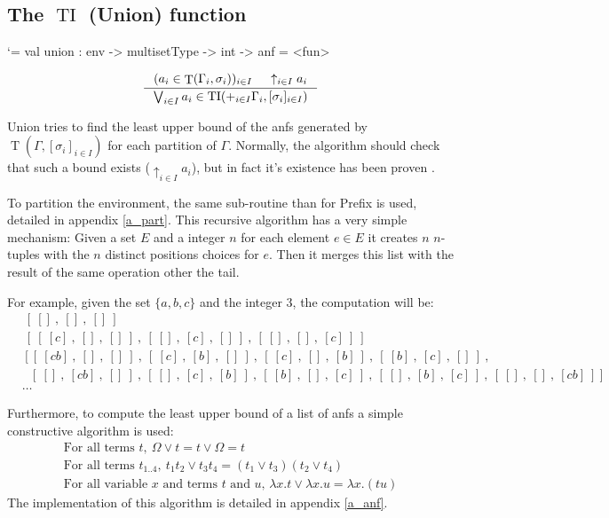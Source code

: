 \documentclass{article}
\let\origlstlisting=\lstlisting
\let\endoriglstlisting=\endlstlisting
\renewenvironment{lstlisting}
{\mathcode`\-=\hyphenmathcode
    \everymath{}\mathsurround=0pt\origlstlisting}
{\endoriglstlisting}
\DeclareMathOperator{\iT}{T}
\DeclareMathOperator{\iTI}{TI}
\begin{document}
\subsection{The $\iTI$ (Union) function}
\label{ss_ti}

\begin{lstlisting}
val union : env -> multisetType -> int -> anf = <fun>
\end{lstlisting}

\begin{displaymath}
    \inference[]{(a_i \in \iT(\Gamma_i, \sigma_i))_{i \in I} & \uparrow_{i \in I}a_i}{ \bigvee_{i \in I} a_i \in \iTI(+_{i \in I}\Gamma_i, [\sigma_i]_{i \in I}) }
\end{displaymath}

Union tries to find the least upper bound of the anfs generated by $\iT(\Gamma, [\sigma_i]_{i \in I})$ for each partition of $\Gamma$. Normally, the algorithm should check that such a bound exists ($\uparrow_{i \in I}a_i$), but in fact it's existence has been proven \cite{Kes}.

To partition the environment, the same sub-routine than for Prefix is used, detailed in appendix \ref{a_part}. This recursive algorithm has a very simple mechanism:
Given a set $E$ and a integer $n$ for each element $e\in E$ it creates $n$ $n$-tuples with the $n$ distinct positions choices for $e$. Then it merges this list with the result of the same operation other the tail.

For example, given the set $\{a,b,c\}$ and the integer 3, the computation will be:
\begin{align*}
    &\ [\ []\ ,\ []\ ,\ []\ ]\ &
    \\&\ [\ [\ [c]\ ,\ []\ ,\ []\ ]\ ,\ [\ []\ ,\ [c]\ ,\ []\ ]\ ,\ [\ []\ ,\ []\ ,\ [c]\ ]\ ]\ &
    \\&\ [\ [\ [cb]\ ,\ []\ ,\ []\ ]\ ,\ [\ [c]\ ,\ [b]\ ,\ []\ ]\ ,\ [\ [c]\ ,\ []\ ,\ [b]\ ]\ ,
    \ [\ [b]\ ,\ [c]\ ,\ []\ ]\ ,&
    \\&\ \ \ [\ []\ ,\ [cb]\ ,\ []\ ]\ ,\ [\ []\ ,\ [c]\ ,\ [b]\ ]\ ,
    \ [\ [b]\ ,\ []\ ,\ [c]\ ]\ ,\ [\ []\ ,\ [b]\ ,\ [c]\ ]\ ,\ [\ []\ ,\ []\ ,\ [cb]\ ]\  ]&
    \\&\ldots&
\end{align*}

Furthermore, to compute the least upper bound of a list of anfs a simple constructive algorithm is used:
\begin{gather*}
    \text{For all terms }t,\ \Omega \vee t = t \vee \Omega = t 
    \\
    \text{For all terms }t_{1..4},\ t_1t_2\vee t_3t_4 = (t_1\vee t_3)(t_2\vee t_4) \\
    \text{For all variable $x$ and terms $t$ and $u$, } \lambda x.t \vee \lambda x.u = \lambda x.(tu)
\end{gather*}
The implementation of this algorithm is detailed in appendix \ref{a_anf}.
\end{document}
